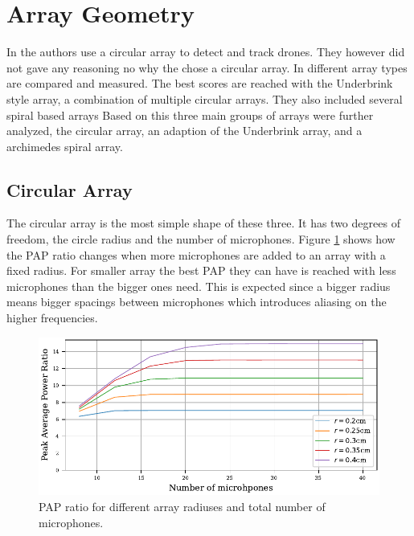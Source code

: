 \section{Array Geometry}
In  the authors use a circular array to detect and track drones.
They however did not gave any reasoning no why the chose a circular array.
\cite{bandkProducts}
In \cite{arr1} different array types are compared and measured.
The best scores are reached with the Underbrink style array, a combination
of multiple circular arrays.
They also included several spiral based arrays
Based on this three main groups of arrays were further analyzed,
the circular array, an adaption of the Underbrink array, and a archimedes
spiral array.
\subsection{Circular Array}
The circular array is the most simple shape of these three.
It has two degrees of freedom, the circle radius and the number of microphones.
Figure \ref*{aev:fig:MicCirc} shows how the PAP ratio changes when
more microphones are added to an array with a fixed radius.
For smaller array the best PAP they can have is reached with less
microphones than the bigger ones need.
This is expected since a bigger radius means bigger spacings between microphones
which introduces aliasing on the higher frequencies.
\begin{figure}[h]
	\centering
	\includegraphics[]{images/5_array_evaluation/circ_m_pap.pdf}
	\caption{PAP ratio for different array radiuses and total number
		of microphones.}
	\label{aev:fig:MicCirc}
\end{figure}

